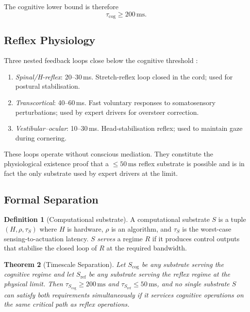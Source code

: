 \documentclass[11pt,twocolumn]{article}
\newtheorem{theorem}{Theorem}
\theoremstyle{definition}
\newtheorem{definition}[theorem]{Definition}
\theoremstyle{remark}
\begin{document}
\noindent The cognitive lower bound is therefore
\begin{equation}
\tau_{\mathrm{cog}} \ge 200\,\mathrm{ms}. \label{eq:tau-cog}
\end{equation}

\subsection{Reflex Physiology}

Three nested feedback loops close below the cognitive threshold \cite{kandel2013principles,enoka2015neuromechanics,eccles1957physiology}:

\begin{enumerate}[leftmargin=*,itemsep=2pt]
\item \emph{Spinal/H-reflex}: 20--30\,ms. Stretch-reflex loop closed in the cord; used for postural stabilisation.
\item \emph{Transcortical}: 40--60\,ms. Fast voluntary responses to somatosensory perturbations; used by expert drivers for oversteer correction.
\item \emph{Vestibular--ocular}: 10--30\,ms. Head-stabilisation reflex; used to maintain gaze during cornering.
\end{enumerate}

These loops operate without conscious mediation. They constitute the physiological existence proof that a $\le 50\,\mathrm{ms}$ reflex substrate is possible and is in fact the only substrate used by expert drivers at the limit.

\subsection{Formal Separation}

\begin{definition}[Computational substrate]\label{def:substrate}
A computational substrate $S$ is a tuple $(H, \rho, \tau_S)$ where $H$ is hardware, $\rho$ is an algorithm, and $\tau_S$ is the worst-case sensing-to-actuation latency. $S$ \emph{serves} a regime $R$ if it produces control outputs that stabilise the closed loop of $R$ at the required bandwidth.
\end{definition}

\begin{theorem}[Timescale Separation]\label{thm:timescale}
Let $S_{\mathrm{cog}}$ be any substrate serving the cognitive regime and let $S_{\mathrm{ref}}$ be any substrate serving the reflex regime at the physical limit. Then $\tau_{S_{\mathrm{cog}}} \ge 200\,\mathrm{ms}$ and $\tau_{S_{\mathrm{ref}}} \le 50\,\mathrm{ms}$, and no single substrate $S$ can satisfy both requirements simultaneously if it services cognitive operations on the same critical path as reflex operations.
\end{theorem}
\end{document}
